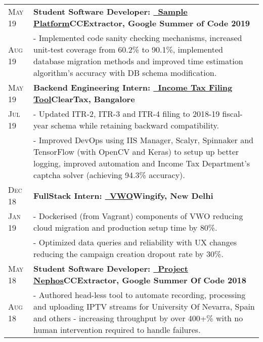 \documentclass[a4paper,10pt]{extarticle} %
\begin{document}
\begin{tabularx}{\linewidth}{ l | X }
\textsc{May 19} & \textbf{Student Software Developer: {\href{https://github.com/CCExtractor/sample-platform}{\ Sample Platform}}}\hfill\textbf{CCExtractor, Google Summer of Code 2019}\\
\textsc{Aug 19}& {- Implemented code sanity checking mechanisms, increased unit-test coverage from 60.2\% to 90.1\%, implemented database migration methods and improved time estimation algorithm's accuracy with DB schema modification.}\\[2mm]

\textsc{May 19} & \textbf{Backend Engineering Intern: {\href{https://cleartax.in/income-tax-efiling}{\ Income Tax Filing Tool}}}\hfill\textbf{ClearTax, Bangalore}\\
\textsc{Jul 19}& {- Updated ITR-2, ITR-3 and ITR-4 filing to 2018-19 fiscal-year schema while retaining backward compatibility.}\\
& {- Improved DevOps using IIS Manager, Scalyr, Spinnaker and TensorFlow (with OpenCV and Keras) to setup up better logging, improved automation and Income Tax Department's captcha solver (achieving 94.3\% accuracy).}\\[2mm]

\textsc{Dec 18} & \textbf{FullStack Intern: {\href{https://vwo.com/}{\ VWO}}}\hfill\textbf{Wingify, New Delhi}\\
\textsc{Jan 19}& {- Dockerised (from Vagrant) components of VWO reducing cloud migration and production setup time by 80\%.}\\
& {- Optimized data queries and reliability with UX changes reducing the campaign creation dropout rate by 30\%.}\\[2mm]

\textsc{May 18} & \textbf{Student Software Developer: {\href{https://github.com/thealphadollar/Nephos}{\ Project Nephos}}}\hfill\textbf{CCExtractor, Google Summer Of Code 2018}\\
\textsc{Aug 18}& {- Authored head-less tool to automate recording, processing and uploading IPTV streams for University Of Nevarra, Spain and others - increasing throughput by over 400+\% with no human intervention required to handle failures.}\\

\end{tabularx}
\end{document}

